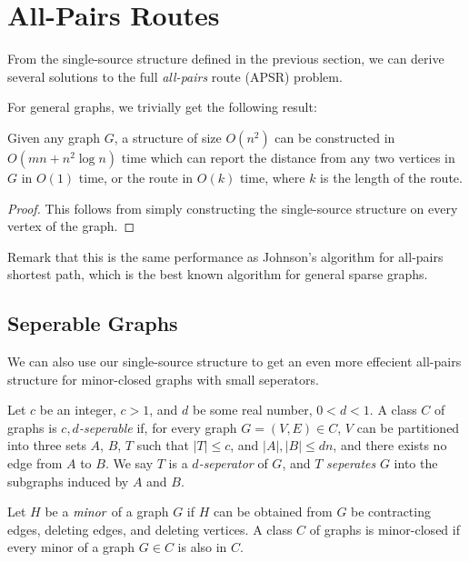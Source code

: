 \documentclass{cccg13}
\begin{document}

\section{All-Pairs \Supplied{} Routes}
From the single-source structure defined in the previous section, we can derive several solutions to the full \emph{all-pairs} \supplied{} route (APSR) problem.

For general graphs, we trivially get the following result:

\begin{theorem}
    Given any graph $G$, a structure of size $O(n^2)$ can be constructed in $O(mn + n^2\log n)$ time which can report the \supplied{} distance from any two vertices in $G$ in $O(1)$ time, or the \supplied{} route in $O(k)$ time, where $k$ is the length of the route.
\end{theorem}

\begin{proof}
    This follows from simply constructing the single-source structure on every vertex of the graph.
\end{proof}

Remark that this is the same performance as Johnson's algorithm for all-pairs shortest path, which is the best known algorithm for general sparse graphs.

\subsection{Seperable Graphs}

We can also use our single-source structure to get an even more effecient all-pairs structure for minor-closed graphs with small seperators.

\begin{defn}
    Let $c$ be an integer, $c > 1$, and $d$ be some real number, $0 < d < 1$. A class $C$ of graphs is \emph{$c,d$-seperable} if, for every graph $G = (V,E) \in C$, $V$ can be partitioned into three sets $A$, $B$, $T$ such that $|T| \leq c$, and $|A|,|B| \leq dn$, and there exists no edge from $A$ to $B$. We say $T$ is a \emph{$d$-seperator} of $G$, and $T$ \emph{seperates} $G$ into the subgraphs induced by $A$ and $B$. 
\end{defn}

\begin{defn}
    Let $H$ be a $\emph{minor}$ of a graph $G$ if $H$ can be obtained from $G$ be contracting edges, deleting edges, and deleting vertices. A class $C$ of graphs is minor-closed if every minor of a graph $G \in C$ is also in $C$.
\end{defn}
\end{document}
